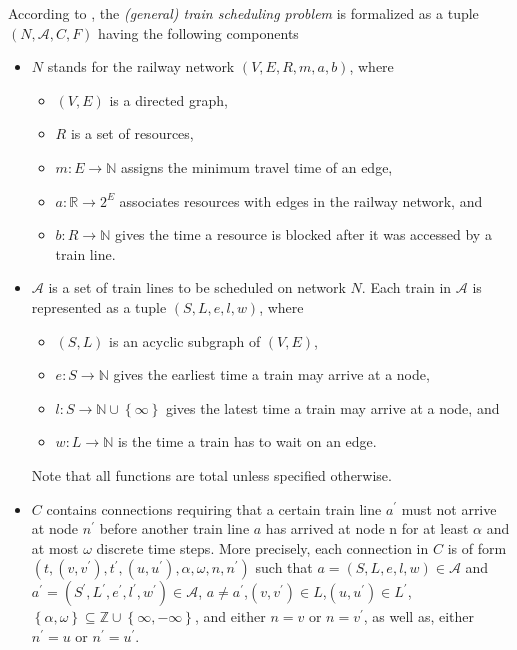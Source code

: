 \documentclass{article}
\begin{document}
According to \cite{DBLP:journals/corr/abs-2003-08598},  the \emph{(general) train scheduling problem} is formalized as a tuple $(N, \mathcal{A}, C, F)$ having the following components
\begin{itemize}
    \item $N$ stands for the railway network $(V, E, R, m, a, b)$, where
        \begin{itemize}
            \item $(V, E)$ is a directed graph,
            \item $R$ is a set of resources,
            \item $m:E\to\mathbb{N}$ assigns the minimum travel time of an edge,
            \item $a: \mathbb{R}\to 2^E$ associates resources with edges in the railway network, and
            \item $b:R\to \mathbb{N}$ gives the time a resource is blocked after it was accessed by a train line.
        \end{itemize}
    \item $\mathcal{A}$ is a set of train lines to be scheduled on network $N$. Each train in $\mathcal{A}$ is represented as a tuple $(S, L, e, l, w)$, where
        \begin{itemize}
            \item $(S, L)$ is an acyclic subgraph of $(V, E)$,
            \item $e:S \to \mathbb{N}$ gives the earliest time a train may arrive at a node,
            \item $l:S\to \mathbb{N} \cup \left\{\infty\right\}$ gives the latest time a train may arrive at a node, and
            \item $w:L\to \mathbb{N}$ is the time a train has to wait on an edge.
        \end{itemize}
        Note that all functions are total unless specified otherwise.
        \item $C$ contains connections requiring that a certain train line $a^\prime$ must not arrive at node $n^\prime$ before another train line $a $ has arrived at node n for at least $\alpha$ and at most $\omega$ discrete time steps. More precisely, each connection in $C$ is of form $(t,(v, v^\prime), t^\prime,(u, u^\prime), \alpha, \omega, n, n^\prime)$ such that $a= (S, L, e, l, w)\in \mathcal{A}$ and $a^\prime= (S^\prime, L^\prime, e^\prime, l^\prime, w^\prime)\in \mathcal{A}$, $a\not=a^\prime$,$(v, v^\prime)\in L$,$(u, u^\prime)\in L^\prime$,$\left\{\alpha,\omega\right\} \subseteq \mathbb{Z} \cup \left\{\infty,-\infty\right\}$, and either $n=v$ or $n=v^\prime$, as well as, either $n^\prime=u$ or $n^\prime=u^\prime$.

\end{itemize}
\end{document}
